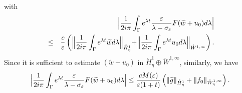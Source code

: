 \documentclass[11pt]{article}
\begin{document}
with%
\begin{eqnarray*}
&& \Bigl|\frac{1}{2i\pi }\int_{\Gamma }e^{\lambda t}\frac{\varepsilon }{\lambda
-\sigma _{\varepsilon }}F(\widetilde{w}+u_{0})d\lambda \Bigr| \\
&\leq &\frac{c}{\varepsilon }\left( \Bigl\|\frac{1}{2i\pi }\int_{\Gamma
}e^{\lambda t}\widetilde{w}d\lambda \Bigr\|_{\mathring{H}_{\eta}^{1}}+\Bigr\|\frac{1}{%
2i\pi }\int_{\Gamma }e^{\lambda t}u_{0}d\lambda \Bigl\|_{\mathring{W}^{1,\infty
}}\right) .
\end{eqnarray*}%
Since it is sufficient to estimate $(\widetilde{w}+u_{0})$ in $\mathring{H}%
_{\eta}^{1}\oplus \mathring{W}^{1,\infty }$,
similarly, we have
\begin{equation*}
\Bigl|\frac{1}{2i\pi }\int_{\Gamma }e^{\lambda t}\frac{\varepsilon }{\lambda
-\sigma _{\varepsilon }}F(\widetilde{w}+u_{0})d\lambda \Bigr|\leq \frac{%
cM(\varepsilon) }{\varepsilon (1+t)}\left( 
\|\widetilde{g}\|_{\mathring{H}_{\eta}^{1}}
+\|f_{0}\|_{\mathring{W}%
_{\eta}^{1,\infty }}\right) .
\end{equation*}
\end{document}
